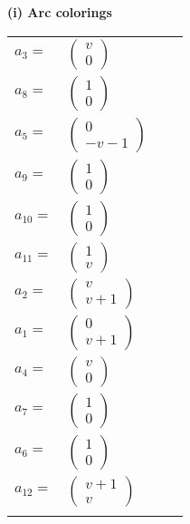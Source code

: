 \documentclass[1p]{elsarticle_modified}
\theoremstyle{definition}
\begin{document}
\flushleft \textbf{(i) Arc colorings}\\
\begin{tabular}{m{7pt} m{180pt} m{7pt} m{180pt} }
\flushright $a_{3}=$&$\begin{pmatrix}v\\0\end{pmatrix}$ \\
\flushright $a_{8}=$&$\begin{pmatrix}1\\0\end{pmatrix}$ \\
\flushright $a_{5}=$&$\begin{pmatrix}0\\- v-1\end{pmatrix}$ \\
\flushright $a_{9}=$&$\begin{pmatrix}1\\0\end{pmatrix}$ \\
\flushright $a_{10}=$&$\begin{pmatrix}1\\0\end{pmatrix}$ \\
\flushright $a_{11}=$&$\begin{pmatrix}1\\v\end{pmatrix}$ \\
\flushright $a_{2}=$&$\begin{pmatrix}v\\v+1\end{pmatrix}$ \\
\flushright $a_{1}=$&$\begin{pmatrix}0\\v+1\end{pmatrix}$ \\
\flushright $a_{4}=$&$\begin{pmatrix}v\\0\end{pmatrix}$ \\
\flushright $a_{7}=$&$\begin{pmatrix}1\\0\end{pmatrix}$ \\
\flushright $a_{6}=$&$\begin{pmatrix}1\\0\end{pmatrix}$ \\
\flushright $a_{12}=$&$\begin{pmatrix}v+1\\v\end{pmatrix}$\\&\end{tabular}
\end{document}
